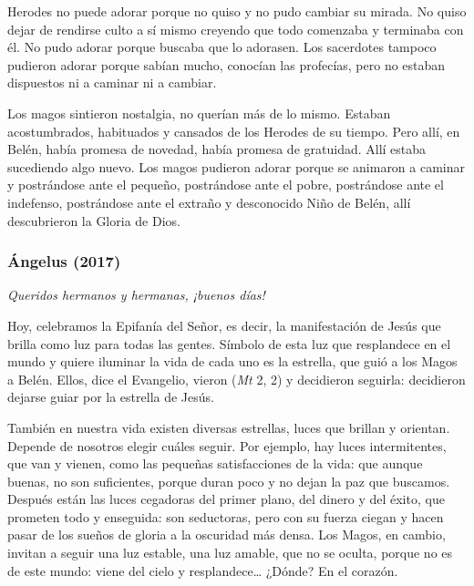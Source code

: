 {Herodes no puede adorar porque no quiso y no pudo cambiar su mirada. No quiso dejar de rendirse culto a sí mismo creyendo que todo comenzaba y terminaba con él. No pudo adorar porque buscaba que lo adorasen. Los sacerdotes tampoco pudieron adorar porque sabían mucho, conocían las profecías, pero no estaban dispuestos ni a caminar ni a cambiar.

Los magos sintieron nostalgia, no querían más de lo mismo. Estaban acostumbrados, habituados y cansados de los Herodes de su tiempo. Pero allí, en Belén, había promesa de novedad, había promesa de gratuidad. Allí estaba sucediendo algo nuevo. Los magos pudieron adorar porque se animaron a caminar y postrándose ante el pequeño, postrándose ante el pobre, postrándose ante el indefenso, postrándose ante el extraño y desconocido Niño de Belén, allí descubrieron la Gloria de Dios.

\subsubsection{Ángelus (2017)} \emph{Queridos hermanos y hermanas, ¡buenos días!}

Hoy, celebramos la Epifanía del Señor, es decir, la manifestación de Jesús que brilla como luz para todas las gentes. Símbolo de esta luz que resplandece en el mundo y quiere iluminar la vida de cada uno es la estrella, que guió a los Magos a Belén. Ellos, dice el Evangelio, vieron  (\emph{Mt} 2, 2) y decidieron seguirla: decidieron dejarse guiar por la estrella de Jesús.

También en nuestra vida existen diversas estrellas, luces que brillan y orientan. Depende de nosotros elegir cuáles seguir. Por ejemplo, hay luces intermitentes, que van y vienen, como las pequeñas satisfacciones de la vida: que aunque buenas, no son suficientes, porque duran poco y no dejan la paz que buscamos. Después están las luces cegadoras del primer plano, del dinero y del éxito, que prometen todo y enseguida: son seductoras, pero con su fuerza ciegan y hacen pasar de los sueños de gloria a la oscuridad más densa. Los Magos, en cambio, invitan a seguir una luz estable, una luz amable, que no se oculta, porque no es de este mundo: viene del cielo y resplandece\ldots{} ¿Dónde? En el corazón.

}
